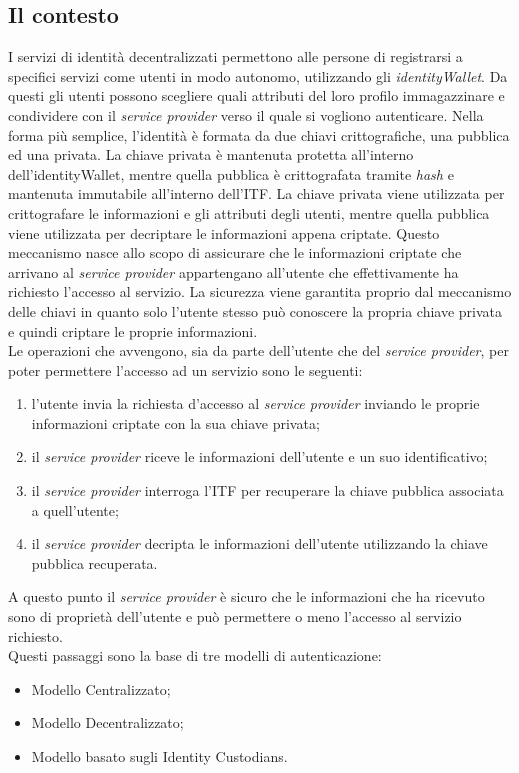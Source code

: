 \subsection{Il contesto}
I servizi di identità decentralizzati permettono alle persone di registrarsi a specifici servizi come utenti in modo autonomo, utilizzando gli \emph{\gls{identityWallet}}\glsfirstoccur. 
Da questi gli utenti possono scegliere quali attributi del loro profilo immagazzinare e condividere con il \textit{service provider} verso il quale si vogliono autenticare.
Nella forma più semplice, l'identità è formata da due chiavi crittografiche, una pubblica ed una privata.
La chiave privata è mantenuta protetta all'interno dell'\gls{identityWallet}, mentre quella pubblica è crittografata tramite \textit{hash} e mantenuta immutabile all'interno dell'\gls{ITF}. 
La chiave privata viene utilizzata per crittografare le informazioni e gli attributi degli utenti, mentre quella pubblica viene utilizzata per decriptare le informazioni appena criptate. Questo meccanismo nasce allo scopo di assicurare che le informazioni criptate che arrivano al \textit{service provider} appartengano all'utente che effettivamente ha richiesto l'accesso al servizio. La sicurezza viene garantita proprio dal meccanismo delle chiavi in quanto solo l'utente stesso può conoscere la propria chiave privata e quindi criptare le proprie informazioni.\\
Le operazioni che avvengono, sia da parte dell'utente che del \textit{service provider}, per poter permettere l'accesso ad un servizio sono le seguenti:
\begin{enumerate}
	\item l'utente invia la richiesta d'accesso al \textit{service provider} inviando le proprie informazioni criptate con la sua chiave privata;
	\item il \textit{service provider} riceve le informazioni dell'utente e un suo identificativo;
	\item il \textit{service provider} interroga l'\gls{ITF} per recuperare la chiave pubblica associata a quell'utente;
	\item il \textit{service provider} decripta le informazioni dell'utente utilizzando la chiave pubblica recuperata.
\end{enumerate}
A questo punto il \textit{service provider} è sicuro che le informazioni che ha ricevuto sono di proprietà dell'utente e può permettere o meno l'accesso al servizio richiesto.\\
Questi passaggi sono la base di tre modelli di autenticazione:
\begin{itemize}
	\item Modello Centralizzato;
	\item Modello Decentralizzato;
	\item Modello basato sugli Identity Custodians.
\end{itemize}

